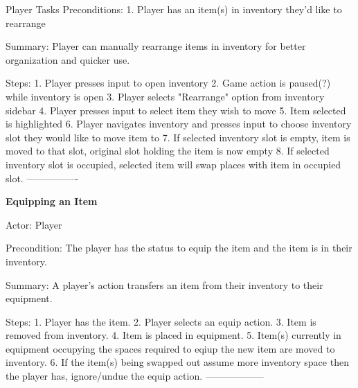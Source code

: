 \documentclass[12pt]{report}
\begin{document}
\begin {section}{Player Tasks}
Preconditions:
1. Player has an item(s) in inventory they'd like to rearrange

Summary: Player can manually rearrange items in inventory for better organization and quicker use.

Steps:
1. Player presses input to open inventory
2. Game action is paused(?) while inventory is open
3. Player selects "Rearrange" option from inventory sidebar
4. Player presses input to select item they wish to move
5. Item selected is highlighted
6. Player navigates inventory and presses input to choose inventory slot they would like to move item to
7. If selected inventory slot is empty, item is moved to that slot, original slot holding the item is now empty
8. If selected inventory slot is occupied, selected item will swap places with item in occupied slot. 
----------------

\textbf{Equipping an Item} %

Actor: Player

Precondition: The player has the status to equip the item and the item is in their inventory.

Summary: A player's action transfers an item from their inventory to their equipment.

Steps:
1. Player has the item.
2. Player selects an equip action.
3. Item is removed from inventory.
4. Item is placed in equipment.
5. Item(s) currently in equipment occupying the spaces required to eqiup the new item are moved to inventory.
6. If the item(s) being swapped out assume more inventory space then the player has, ignore/undue the equip action.
------------------

\end{section}
\end{document}
